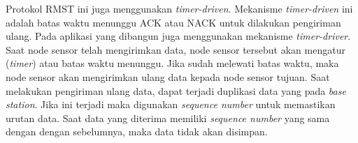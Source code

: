Protokol RMST ini juga menggunakan \textit{timer-driven}. Mekanisme \textit{timer-driven} ini adalah batas waktu menunggu ACK atau NACK untuk dilakukan pengiriman ulang. Pada aplikasi yang dibangun juga menggunakan mekanisme \textit{timer-driver}. Saat node sensor telah mengirimkan data, node sensor tersebut akan mengatur (\textit{timer}) atau batas waktu menunggu. Jika sudah melewati batas waktu, maka node sensor akan mengirimkan ulang data kepada node sensor tujuan. Saat melakukan pengiriman ulang data, dapat terjadi duplikasi data yang pada \textit{base station}. Jika ini terjadi maka digunakan \textit{sequence number} untuk memastikan urutan data. Saat data yang diterima memiliki \textit{sequence number} yang sama dengan dengan sebelumnya, maka data tidak akan disimpan.

